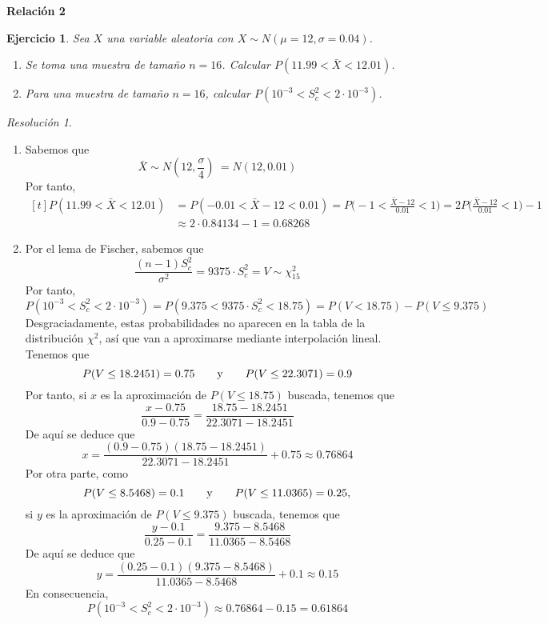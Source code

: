 \documentclass[11pt]{report}
\newtheorem{exercise}{Ejercicio}
\theoremstyle{remark}
\newtheorem*{resolution}{Resolución}
\begin{document}
\begin{center}
    \textbf{Relación 2} \\
\end{center}

\begin{exercise}
Sea $X$ una variable aleatoria con $X \sim N(\mu=12,\sigma=0.04)$.
\begin{enumerate}
    \item Se toma una muestra de tamaño $n = 16$. Calcular $P(11.99<\bar{X}<12.01)$.
    \item Para una muestra de tamaño $n = 16$, calcular $P(10^{-3}<S^2_c<2\cdot 10^{-3})$.
\end{enumerate}
\end{exercise}

\begin{resolution}
\hfill
\begin{enumerate}

    \item Sabemos que
    \[\bar{X} \sim N(12,\frac{\sigma}{4})\ = N(12,0.01)\]
    Por tanto,
    \[
    \begin{aligned}[t]
        P(11.99<\bar{X}<12.01) &= P(-0.01<\bar{X}-12<0.01) = P\bigl(-1<\frac{\bar{X}-12}{0.01}<1\bigr) = 2P\bigl(\frac{\bar{X}-12}{0.01}<1\bigr)-1 \\
        &\approx 2 \cdot 0.84134-1 = 0.68268
    \end{aligned}
    \]
    \item Por el lema de Fischer, sabemos que
    \[\frac{(n-1)S^2_c}{\sigma^2} = 9375\cdot S^2_c = V \sim \chi^2_{15}\]
    Por tanto,
    \[P(10^{-3}<S^2_c<2\cdot 10^{-3}) = P(9.375<9375\cdot S^2_c<18.75) = P(V < 18.75)- P(V \leq 9.375)\]
    Desgraciadamente, estas probabilidades no aparecen en la tabla de la distribución $\chi^2$, así que van a aproximarse mediante interpolación lineal. Tenemos que
    \[P(V \leq 18.2451) = 0.75 \qquad \textup{y} \qquad P(V \leq 22.3071) = 0.9\]
    Por tanto, si $x$ es la aproximación de $P(V\leq 18.75)$ buscada, tenemos que
    \[\frac{x-0.75}{0.9-0.75} = \frac{18.75-18.2451}{22.3071-18.2451}\]
    De aquí se deduce que
    \[x = \frac{(0.9-0.75)(18.75-18.2451)}{22.3071-18.2451}+0.75 \approx 0.76864\]
    Por otra parte, como
    \[P(V \leq 8.5468) = 0.1 \qquad \textup{y} \qquad P(V \leq 11.0365) = 0.25,\]
    si $y$ es la aproximación de $P(V \leq 9.375)$ buscada, tenemos que
    \[\frac{y-0.1}{0.25-0.1} = \frac{9.375-8.5468}{11.0365-8.5468}\]
    De aquí se deduce que
    \[y = \frac{(0.25-0.1)(9.375-8.5468)}{11.0365-8.5468}+0.1 \approx 0.15\]
    En consecuencia,
    \[P(10^{-3}<S^2_c<2\cdot 10^{-3}) \approx 0.76864-0.15=0.61864\]
\end{enumerate}
    
\end{resolution}
\end{document}
